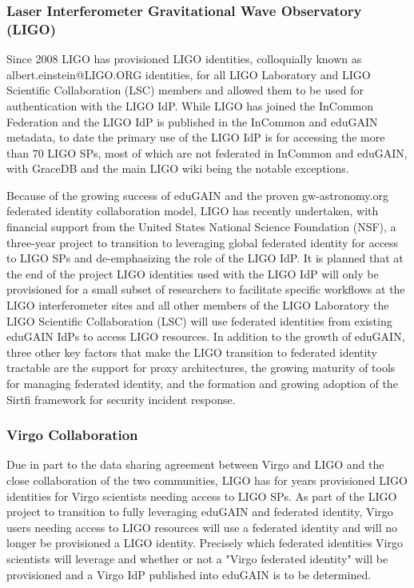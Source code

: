 \documentclass[fleqn,10pt]{wlscirep}
\begin{document}
{\subsubsection{Laser Interferometer Gravitational Wave Observatory (LIGO)}
Since 2008 LIGO has provisioned LIGO identities, colloquially known as albert.einstein@LIGO.ORG identities, for all LIGO Laboratory and LIGO Scientific Collaboration (LSC) members and allowed them to be used for authentication with the LIGO IdP. While LIGO has joined the InCommon Federation and the LIGO IdP is published in the InCommon and eduGAIN metadata, to date the primary use of the LIGO IdP is for accessing the more than 70 LIGO SPs, most of which are not federated in InCommon and eduGAIN, with GraceDB and the main LIGO wiki being the notable exceptions.

Because of the growing success of eduGAIN and the proven gw-astronomy.org federated identity collaboration model, LIGO has recently undertaken, with financial support from the United States National Science Foundation (NSF), a three-year project to transition to leveraging global federated identity for access to LIGO SPs and de-emphasizing the role of the LIGO IdP. It is planned that at the end of the project LIGO identities used with the LIGO IdP will only be provisioned for a small subset of researchers to facilitate specific workflows at the LIGO interferometer sites and all other members of the LIGO Laboratory the LIGO Scientific Collaboration (LSC) will use federated identities from existing eduGAIN IdPs to access LIGO resources. In addition to the growth of eduGAIN, three other key factors that make the LIGO transition to federated identity tractable are the support for proxy architectures, the growing maturity of tools for managing federated identity, and the formation and growing adoption of the Sirtfi framework for security incident response.


\subsubsection{Virgo Collaboration}
Due in part to the data sharing agreement between Virgo and LIGO and the close collaboration of the two communities, LIGO has for years provisioned LIGO identities for Virgo scientists needing access to LIGO SPs. As part of the LIGO project to transition to fully leveraging eduGAIN and federated identity, Virgo users needing access to LIGO resources will use a federated identity and will no longer be provisioned a LIGO identity. Precisely which federated identities Virgo scientists will leverage and whether or not a "Virgo federated identity" will be provisioned and a Virgo IdP published into eduGAIN is to be determined.


}
\end{document}
